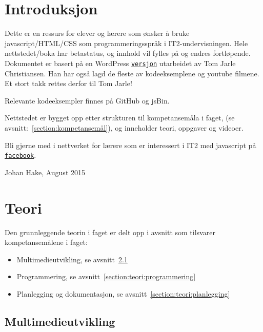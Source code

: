 \documentclass[%
oneside,                 %
final,                   %
12pt]{article}
\begin{document}
\pagebreak

\section{Introduksjon}
\label{section:introduksjon}

Dette er en ressurs for elever og lærere som ønsker å bruke
javascript/HTML/CSS som programmeringsspråk i IT2-undervisningen. Hele
nettstedet/boka har betastatus, og innhold vil fylles på og endres
fortløpende. Dokumentet er basert på en WordPress
\href{{http://www.fuzzbin.org/IT2}}{\nolinkurl{versjon}} utarbeidet av Tom Jarle
Christiansen. Han har også lagd de fleste av kodeeksemplene og youtube
filmene. Et stort takk rettes derfor til Tom Jarle!

Relevante kodeeksempler finnes på GitHub og jsBin.

Nettstedet er bygget opp etter strukturen til kompetansemåla i faget,
(se avsnitt:~\ref{section:kompetansemål}), og inneholder teori, oppgaver
og videoer.

Bli gjerne med i nettverket for lærere som er interessert i IT2 med
javascript på \href{{https://www.facebook.com/groups/231993360276497}}{\nolinkurl{facebook}}.

Johan Hake, August 2015


\pagebreak

\section{Teori}

Den grunnleggende teorin i faget er delt opp i avsnitt som tilsvarer
kompetansemålene i faget:

\begin{itemize}
\item Multimedieutvikling, se avsnitt~\ref{section:teori:multimedieutvikling}

\item Programmering, se avsnitt~\ref{section:teori:programmering}

\item Planlegging og dokumentasjon, se avsnitt~\ref{section:teori:planlegging}
\end{itemize}

\noindent

\subsection{Multimedieutvikling}
\label{section:teori:multimedieutvikling}
\end{document}
